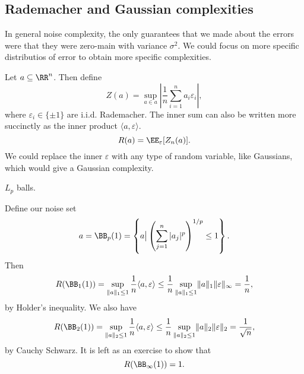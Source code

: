 \subsection{Rademacher and Gaussian complexities}
In general noise complexity, the only guarantees that we made about the errors were that they were zero-main with variance $\sigma^2$. We could focus on more specific distributios of error to obtain more specific complexities. 

Let $a\subseteq \RR^n$. Then define 
\[Z(a) = \sup_{a\in a}\left\vert \frac{1}{n}\sum_{i=1}^n a_i\varepsilon_i\right\vert,\] 
where $\varepsilon_i\in \{\pm 1\}$ are i.i.d. Rademacher. The inner sum can also be written more succinctly as the inner product $\langle a,\varepsilon\rangle$.
\[R(a) = \EE_{\varepsilon}[Z_n(a)].\] 
We could replace the inner $\varepsilon$ with any type of random variable, like Gaussians, which would give a Gaussian complexity. 
\begin{example}
\exlabel

$L_p$ balls. 
\end{example}

\noindent Define our noise set 
\[a = \BB_p(1) = \left\{a \big| \left(\sum_{j=1}^n \vert a_j\vert^p\right)^{1/p}\leq 1\right\}.\] 
Then 
\[R(\BB_1(1)) = \sup_{\lVert a\rVert_1\leq 1}\frac{1}{n}\langle a,\varepsilon \rangle \leq \frac{1}{n} \sup_{\lVert a\rVert_1\leq 1} \lVert a\rVert_1\lVert \varepsilon\rVert_{\infty} = \frac{1}{n},\]
by Holder's inequality. 
We also have 
\[R(\BB_2(1)) = \sup_{\lVert a\rVert_2\leq 1}\frac{1}{n}\langle a,\varepsilon \rangle \leq \frac{1}{n} \sup_{\lVert a\rVert_2\leq 1} \lVert a\rVert_2\lVert \varepsilon\rVert_{2} = \frac{1}{\sqrt{n}},\]
by Cauchy Schwarz. It is left as an exercise to show that
\[R(\BB_{\infty}(1)) = 1.\]
